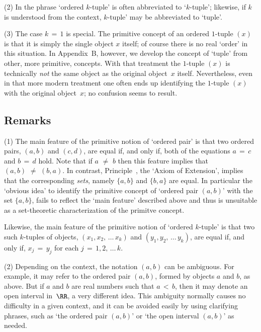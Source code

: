 \V

        (2) In {\ThisText} the phrase `ordered $k$-tuple' is often abbreviated to `$k$-tuple'; likewise, if $k$ is understood from the context, $k$-tuple' may be abbreviated to `tuple'.


\V

        (3) The case $k \,=\, 1$ is special. The primitive concept of an ordered $1$-tuple $(x)$ is that it is simply the single object $x$ itself; of course there is no real `order' in this situation.
    In Appendix~B, however, we develop the concept of `tuple' from other, more primitive, concepts. With that treatment the $1$-tuple $(x)$ is technically {\em not} the same object as the original object~$x$ itself.
    Nevertheless, even in that more modern treatment one often ends up identifying the $1$-tuple $(x)$ with the original object~$x$; no confusion seems to result.


\VV

        \subsection{\bf Remarks}
        \label{RemrkA12.10}

 \hspace*{\parindent} (1) The main feature of the primitive notion of `ordered pair' is that two ordered pairs, $(a,b)$ and $(c,d)$,
    are equal if, and only if, both of the equations $a \,=\, c$ and $b \,=\, d$ hold. Note that if $a \,\,{\neq}\,\, b$ then this feature implies that $(a,b) \,\,{\neq}\,\, (b,a)$.
    In contrast, Principle~, the `Axiom of Extension', implies that the corresponding {\em sets}, namely $\{a,b\}$ and $\{b,a\}$ are equal.
    In particular the `obvious idea' to identify the primitive concept of `ordered pair $(a,b)$' with the set $\{a,b\}$,
    fails to reflect the `main feature' described above and thus is unsuitable as a set-theoretic characterization of the primitve concept.

        Likewise, the main feature of the primitive notion of `ordered $k$-tuple' is that two such $k$-tuples of objects, $(x_{1}, x_{2},\,{\ldots}\,x_{k})$ and $(y_{1}, y_{2},\,{\ldots}\,y_{k})$,
    are equal if, and only if, $x_{j} \,=\, y_{j}$ for each $j \,=\, 1, 2, \,{\ldots}\,k$.

\V

        (2) Depending on the context, the notation $(a,b)$ can be ambiguous. For example,
    it may refer to the ordered pair $(a,b)$, formed by objects $a$ and $b$, as above.
    But if $a$ and $b$ are real numbers such that $a\,<\,b$, then it may denote an open interval in~${\RR}$, a very different idea. This ambiguity normally causes no difficulty in a given context,
    and it can be avoided easily by using clarifying phrases, such as `the ordered pair $(a,b)$' or `the open interval $(a,b)$' as needed.

